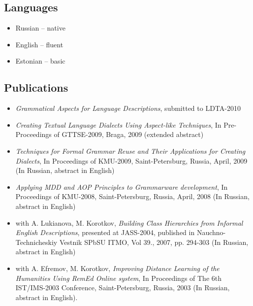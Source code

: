\documentclass[a4paper, 12pt]{article}
\begin{document}
\subsection*{Languages}

\begin{itemize}
	\item Russian -- native
	\item English -- fluent
	\item Estonian -- basic
\end{itemize}

\subsection*{Publications}
\begin{itemize}
	\item {\it Grammatical Aspects for Language Descriptions}, submitted to LDTA-2010
	\item {\it Creating Textual Language Dialects Using Aspect-like Techniques}, In Pre-Proceedings of GTTSE-2009, Braga, 2009 (extended abstract)
	\item {\it Techniques for Formal Grammar Reuse and Their Applications for Creating Dialects}, In Proceedings of KMU-2009, Saint-Petersburg, Russia, April, 2009 (In Russian, abstract in English)
	\item {\it Applying MDD and AOP Principles to Grammarware development}, In Proceedings of KMU-2008, Saint-Petersburg, Russia, April, 2008 (In Russian, abstract in English)
	\item with A. Lukianova, M. Korotkov, {\it Building Class Hierarchies from Informal English Descriptions}, presented at JASS-2004, published in Nauchno-Technicheskiy Vestnik SPbSU ITMO, Vol 39., 2007, pp. 294-303 (In Russian, abstract in English)
	\item with A. Efremov, M. Korotkov, {\it Improving Distance Learning of the Humanities Using {\it RemEd} Online system}, In Proceedings of The 6th IST/IMS-2003 Conference, Saint-Petersburg, Russia, 2003 (In Russian, abstract in English).
\end{itemize}
\end{document}
